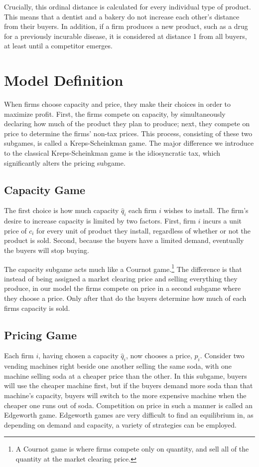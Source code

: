 \documentclass[11pt]{article}
\begin{document}
Crucially, this ordinal distance is calculated for every individual type of
product. This means that a dentist and a bakery do not increase each other's
distance from their buyers. In addition, if a firm produces a new product, such
as a drug for a previously incurable disease, it is considered at distance 1
from all buyers, at least until a competitor emerges.

\section{Model Definition}
When firms choose capacity and price, they make their choices in order to
maximize profit. First, the firms compete on capacity, by simultaneously
declaring how much of the product they plan to produce; next, they compete on
price to determine the firms' non-tax prices. This process, consisting of these
two subgames, is called a Kreps-Scheinkman game. The major difference we
introduce to the classical Kreps-Scheinkman game is the idiosyncratic tax,
which significantly alters the pricing subgame.

\subsection{Capacity Game}
The first choice is how much capacity $\hat q_i$ each firm $i$ wishes to
install. The firm's desire to increase capacity is limited by two factors.
First, firm $i$ incurs a unit price of $c_i$ for every unit of product they
install, regardless of whether or not the product is sold. Second, because the
buyers have a limited demand, eventually the buyers will stop buying.

The capacity subgame acts much like a Cournot game.\footnote{A Cournot game is
where firms compete only on quantity, and sell all of the quantity at the
market clearing price.} The difference is that instead of being assigned a
market clearing price and selling everything they produce, in our model the
firms compete on price in a second subgame where they choose a price. Only
after that do the buyers determine how much of each firms capacity is sold.

\subsection{Pricing Game}
Each firm $i$, having chosen a capacity $\hat q_i$, now chooses a price, $p_i$.
Consider two vending machines right beside one another selling the same soda,
with one machine selling soda at a cheaper price than the other. In this
subgame, buyers will use the cheaper machine first, but if the buyers demand
more soda than that machine's capacity, buyers will switch to the more
expensive machine when the cheaper one runs out of soda. Competition on price
in such a manner is called an Edgeworth game. Edgeworth games are very
difficult to find an equilibrium in, as depending on demand and capacity, a
variety of strategies can be employed.
\end{document}
